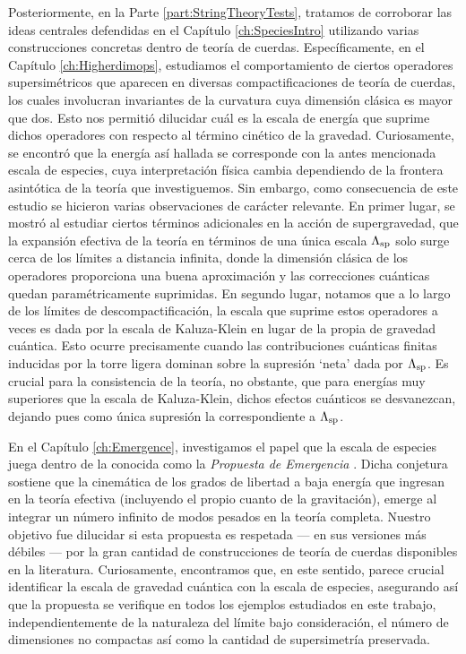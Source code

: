 Posteriormente, en la Parte \ref{part:StringTheoryTests}, tratamos de corroborar las ideas centrales defendidas en el Capítulo \ref{ch:SpeciesIntro} utilizando varias construcciones concretas dentro de teoría de cuerdas. Específicamente, en el Capítulo \ref{ch:Higherdimops}, estudiamos el comportamiento de ciertos operadores supersimétricos que aparecen en diversas compactificaciones de teoría de cuerdas, los cuales involucran invariantes de la curvatura cuya dimensión clásica es mayor que dos. Esto nos permitió dilucidar cuál es la escala de energía que suprime dichos operadores con respecto al término cinético de la gravedad. Curiosamente, se encontró que la energía así hallada se corresponde con la antes mencionada escala de especies, cuya interpretación física cambia dependiendo de la frontera asintótica de la teoría que investiguemos. Sin embargo, como consecuencia de este estudio se hicieron varias observaciones de carácter relevante. En primer lugar, se mostró al estudiar ciertos términos adicionales en la acción de supergravedad, que la expansión efectiva de la teoría en términos de una única escala $\Lambda_{\text{sp}}$ solo surge cerca de los límites a distancia infinita, donde la dimensión clásica de los operadores proporciona una buena aproximación y las correcciones cuánticas quedan paramétricamente suprimidas. En segundo lugar, notamos que a lo largo de los límites de descompactificación, la escala que suprime estos operadores a veces es dada por la escala de Kaluza-Klein en lugar de la propia de gravedad cuántica. Esto ocurre precisamente cuando las contribuciones cuánticas finitas inducidas por la torre ligera dominan sobre la supresión ‘neta’ dada por $\Lambda_{\text{sp}}$. Es crucial para la consistencia de la teoría, no obstante, que para energías muy superiores que la escala de Kaluza-Klein, dichos efectos cuánticos se desvanezcan, dejando pues como única supresión la correspondiente a $\Lambda_{\text{sp}}$.

En el Capítulo \ref{ch:Emergence}, investigamos el papel que la escala de especies juega dentro de la conocida como la \emph{Propuesta de Emergencia} \cite{Harlow:2015lma, Grimm:2018ohb, Heidenreich:2018kpg, Palti:2019pca}. Dicha conjetura sostiene que la cinemática de los grados de libertad a baja energía que ingresan en la teoría efectiva (incluyendo el propio cuanto de la gravitación), emerge al integrar un número infinito de modos pesados en la teoría completa. Nuestro objetivo fue dilucidar si esta propuesta es respetada --- en sus versiones más débiles --- por la gran cantidad de construcciones de teoría de cuerdas disponibles en la literatura. Curiosamente, encontramos que, en este sentido, parece crucial identificar la escala de gravedad cuántica con la escala de especies, asegurando así que la propuesta se verifique en todos los ejemplos estudiados en este trabajo, independientemente de la naturaleza del límite bajo consideración, el número de dimensiones no compactas así como la cantidad de supersimetría preservada.

